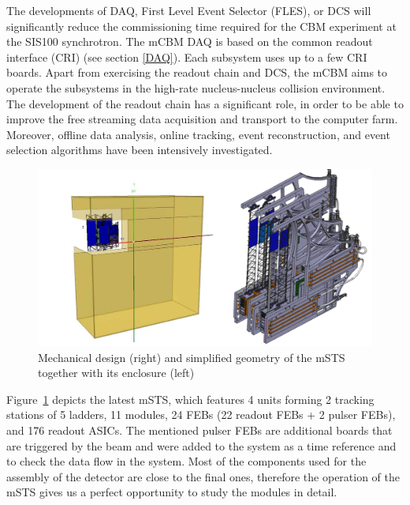 The developments of DAQ, First Level Event Selector (\gls{FLES}), or \gls{DCS} will significantly reduce the commissioning time required for the CBM experiment at the SIS100 synchrotron. The mCBM \gls{DAQ} is based on the common readout interface (\gls{CRI}) (see section \ref{DAQ}). Each subsystem uses up to a few \gls{CRI} boards. Apart from exercising the readout chain and \gls{DCS}, the mCBM aims to operate the subsystems in the high-rate nucleus-nucleus collision environment. The development of the readout chain has a significant role, in order to be able to improve the free streaming data acquisition and transport to the computer farm. Moreover, offline data analysis, online tracking, event reconstruction, and event selection algorithms have been intensively investigated. 

\begin{figure}[!h]
\centering
\includegraphics[width=0.75\columnwidth]{Chapter5/DCS/images/mSTS_mech.png}
\caption{Mechanical design (right) and simplified geometry of the \gls{mSTS} together with its enclosure (left)}
\label{fig_STS}
\end{figure}

Figure~\ref{fig_STS} depicts the latest \gls{mSTS}, which features 4 units forming 2 tracking stations of 5 ladders, 11 modules, 24 \gls{FEB}s (22 readout \gls{FEB}s + 2 pulser \gls{FEB}s), and 176 readout \gls{ASIC}s. The mentioned pulser \gls{FEB}s are additional boards that are triggered by the beam and were added to the system as a time reference and to check the data flow in the system.  Most of the components used for the assembly of the detector are close to the final ones, therefore the operation of the \gls{mSTS} gives us a perfect opportunity to study the modules in detail.
